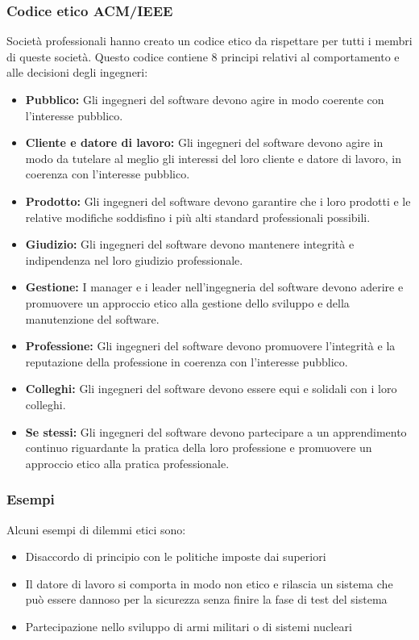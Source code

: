 \documentclass[a4paper]{article}
\begin{document}
\subsubsection{Codice etico ACM/IEEE}
Società professionali hanno creato un codice etico da rispettare per tutti i membri
di queste società. Questo codice contiene 8 principi relativi al comportamento e alle
decisioni degli ingegneri:
\begin{itemize}
    \item \textbf{Pubblico:} Gli ingegneri del software devono agire in modo coerente con
      l'interesse pubblico.
    \item \textbf{Cliente e datore di lavoro:} Gli ingegneri del software devono agire 
      in modo da tutelare al meglio gli interessi del loro cliente e datore di lavoro, 
      in coerenza con l'interesse pubblico.
    \item \textbf{Prodotto:} Gli ingegneri del software devono garantire che i loro 
      prodotti e le relative modifiche soddisfino i più alti standard professionali 
      possibili.
    \item \textbf{Giudizio:} Gli ingegneri del software devono mantenere integrità e 
      indipendenza nel loro giudizio professionale.
    \item \textbf{Gestione:} I manager e i leader nell'ingegneria del software devono
      aderire e promuovere un approccio etico alla gestione dello sviluppo e della 
      manutenzione del software.
    \item \textbf{Professione:} Gli ingegneri del software devono promuovere l'integrità
      e la reputazione della professione in coerenza con l'interesse pubblico.
    \item \textbf{Colleghi:} Gli ingegneri del software devono essere equi e solidali 
      con i loro colleghi.
    \item \textbf{Se stessi:} Gli ingegneri del software devono partecipare a un
      apprendimento continuo riguardante la pratica della loro professione e promuovere
      un approccio etico alla pratica professionale.
\end{itemize}

\subsubsection{Esempi}
Alcuni esempi di dilemmi etici sono:
\begin{itemize}
  \item Disaccordo di principio con le politiche imposte dai superiori
  \item Il datore di lavoro si comporta in modo non etico e rilascia un sistema
    che può essere dannoso per la sicurezza senza finire la fase di test del sistema
  \item Partecipazione nello sviluppo di armi militari o di sistemi nucleari
\end{itemize}
\end{document}
